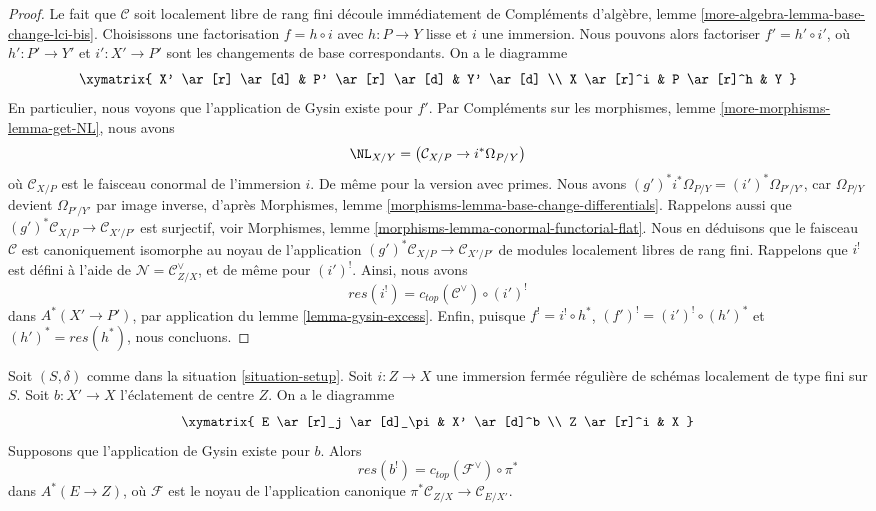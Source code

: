 \begin{proof}
Le fait que $\mathcal{C}$ soit localement libre de rang fini découle immédiatement de
Compléments d'algèbre, lemme \ref{more-algebra-lemma-base-change-lci-bis}.
Choisissons une factorisation $f = h \circ i$ avec $h : P \to Y$ lisse et $i$
une immersion. Nous pouvons alors factoriser $f' = h' \circ i'$, où $h' : P' \to Y'$
et $i' : X' \to P'$ sont les changements de base correspondants. On a le diagramme
$$
\xymatrix{
X' \ar[r] \ar[d] &
P' \ar[r] \ar[d] &
Y' \ar[d] \\
X \ar[r]^i &
P \ar[r]^h &
Y
}
$$
En particulier, nous voyons que l'application de Gysin existe pour $f'$. Par
Compléments sur les morphismes, lemme \ref{more-morphisms-lemma-get-NL},
nous avons
$$
\NL_{X/Y} = \left( \mathcal{C}_{X/P} \to i^*\Omega_{P/Y} \right)
$$
où $\mathcal{C}_{X/P}$ est le faisceau conormal de l'immersion $i$.
De même pour la version avec primes. Nous avons
$(g')^*i^*\Omega_{P/Y} = (i')^*\Omega_{P'/Y'}$, car
$\Omega_{P/Y}$ devient $\Omega_{P'/Y'}$ par image inverse, d'après
Morphismes, lemme \ref{morphisms-lemma-base-change-differentials}.
Rappelons aussi que $(g')^*\mathcal{C}_{X/P} \to \mathcal{C}_{X'/P'}$
est surjectif, voir
Morphismes, lemme \ref{morphisms-lemma-conormal-functorial-flat}.
Nous en déduisons que le faisceau $\mathcal{C}$ est canoniquement
isomorphe au noyau de l'application
$(g')^*\mathcal{C}_{X/P} \to \mathcal{C}_{X'/P'}$
de modules localement libres de rang fini. Rappelons que $i^!$ est défini
à l'aide de $\mathcal{N} = \mathcal{C}_{Z/X}^\vee$, et de même
pour $(i')^!$. Ainsi, nous avons
$$
res(i^!) = c_{top}(\mathcal{C}^\vee) \circ (i')^!
$$
dans $A^*(X' \to P')$, par application du lemme \ref{lemma-gysin-excess}.
Enfin, puisque $f^! = i^! \circ h^*$,
$(f')^! = (i')^! \circ (h')^*$ et $(h')^* = res(h^*)$, nous concluons.
\end{proof}

\begin{lemma}
\label{lemma-blow-up-formula}
Soit $(S, \delta)$ comme dans la situation \ref{situation-setup}.
Soit $i : Z \to X$ une immersion fermée régulière de schémas
localement de type fini sur $S$. Soit $b : X' \to X$
l'éclatement de centre $Z$. On a le diagramme
$$
\xymatrix{
E \ar[r]_j \ar[d]_\pi & X' \ar[d]^b \\
Z \ar[r]^i & X
}
$$
Supposons que l'application de Gysin existe pour $b$. Alors
$$
res(b^!) = c_{top}(\mathcal{F}^\vee) \circ \pi^*
$$
dans $A^*(E \to Z)$, où $\mathcal{F}$ est le noyau de l'application canonique
$\pi^*\mathcal{C}_{Z/X} \to \mathcal{C}_{E/X'}$.
\end{lemma}

